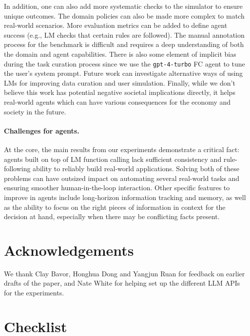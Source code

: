 \documentclass{article}
\begin{document}
In addition, one can also add more systematic checks to the simulator to ensure unique outcomes. The domain policies can also be made more complex to match real-world scenarios. More evaluation metrics can be added to define agent success (e.g., LM checks that certain rules are followed). 
The manual annotation process for the benchmark is difficult and requires a deep understanding of both the domain and agent capabilities. There is also some element of implicit bias during the task curation process since we use the \texttt{gpt-4-turbo} FC agent to tune the user's system prompt. Future work can investigate alternative ways of using LMs for improving data curation and user simulation. Finally, while we don't believe this work has potential negative societal implications directly, it helps real-world agents which can have various consequences for the economy and society in the future.

\paragraph{Challenges for agents.}
At the core, the main results from our experiments demonstrate a critical fact: agents built on top of LM function calling lack sufficient consistency and rule-following ability to reliably build real-world applications. Solving both of these problems can have outsized impact on automating several real-world tasks and ensuring smoother human-in-the-loop interaction. Other specific features to improve in agents include long-horizon information tracking and memory, as well as the ability to focus on the right pieces of information in context for the decision at hand, especially when there may be conflicting facts present.

\section*{Acknowledgements}
We thank Clay Bavor, Honghua Dong and Yangjun Ruan for feedback on earlier drafts of the paper, and Nate White for helping set up the different LLM APIs for the experiments. 




\newpage

\section*{Checklist}
\end{document}
